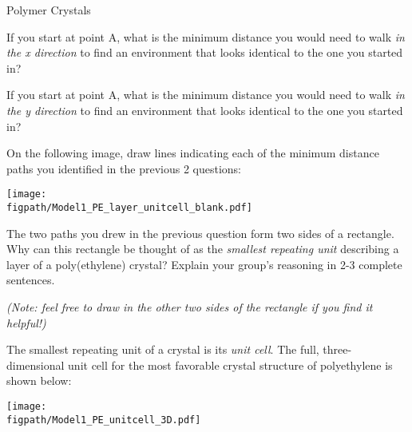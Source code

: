 \begin{activity}{Polymer Crystals}
\begin{ctqs}
\begin{enumerate}
		\begin{solution}[0.75in]
		\end{solution}
			
		\end{enumerate}
		
	\question If you start at point A, what is the minimum distance you would need to walk \textit{in the x direction} to find an environment that looks identical to the one you started in?
	
		\begin{solution}[0.25in]
		\end{solution}
	
	\question If you start at point A, what is the minimum distance you would need to walk \textit{in the y direction} to find an environment that looks identical to the one you started in?
	
		\begin{solution}[0.25in]
		\end{solution}
	
	\question On the following image, draw lines indicating each of the minimum distance paths you identified in the previous 2 questions:

	\vspace{6pt}
	\centerline{\texttt{[image: \\figpath/Model1\_PE\_layer\_unitcell\_blank.pdf]}}	
	
	\question The two paths you drew in the previous question form two sides of a rectangle.  Why can this rectangle be thought of as the \emph{smallest repeating unit} describing a layer of a poly(ethylene) crystal?  Explain your group's reasoning in 2-3 complete sentences.
	
	\emph{(Note: feel free to draw in the other two sides of the rectangle if you find it helpful!)}
	
		\begin{solution}[1.75in]
		\end{solution}
	
\end{ctqs}

\begin{infobox}

	The smallest repeating unit of a crystal is its \emph{unit cell}.  The full, three-dimensional unit cell for the most favorable crystal structure of polyethylene is shown below:
	
	\vspace{6pt}
	\centerline{\texttt{[image: \\figpath/Model1\_PE\_unitcell\_3D.pdf]}}


\end{infobox}
\end{activity}

